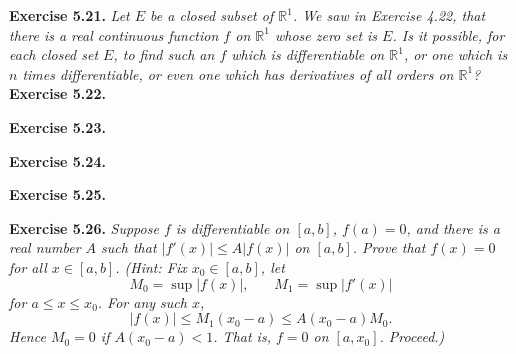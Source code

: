 \documentclass{article}
\begin{document}



\textbf{Exercise 5.21.}
\emph{Let $E$ be a closed subset of $\mathbb{R}^1$.
We saw in Exercise 4.22, that there is a real continuous function $f$ on $\mathbb{R}^1$
whose zero set is $E$.
Is it possible, for each closed set $E$,
to find such an $f$ which is differentiable on $\mathbb{R}^1$,
or one which is $n$ times differentiable,
or even one which has derivatives of all orders on $\mathbb{R}^1$?} \\






\textbf{Exercise 5.22.}






\textbf{Exercise 5.23.}






\textbf{Exercise 5.24.}






\textbf{Exercise 5.25.}






\textbf{Exercise 5.26.}
\emph{Suppose $f$ is differentiable on $[a,b]$, $f(a) = 0$,
and there is a real number $A$ such that $|f'(x)| \leq A|f(x)|$ on $[a,b]$.
Prove that $f(x)=0$ for all $x \in [a,b]$.
(Hint: Fix $x_0 \in [a,b]$, let
\[
  M_0 = \sup{|f(x)|}, \:\:\:\:\:\:\:\: M_1 = \sup{|f'(x)|}
\]
for $a \leq x \leq x_0$.
For any such $x$,
\[
  |f(x)| \leq M_1(x_0-a) \leq A(x_0-a) M_0.
\]
Hence $M_0 = 0$ if $A(x_0-a) < 1$.
That is, $f = 0$ on $[a,x_0]$.
Proceed.)} \\
\end{document}
